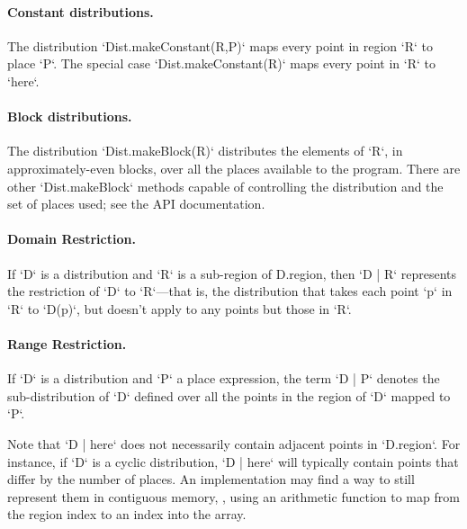 \paragraph{Constant distributions.} 
The distribution \xcd`Dist.makeConstant(R,P)` maps every point in region
\xcd`R` to place \xcd`P`.  
The special case \xcd`Dist.makeConstant(R)` maps every point in \xcd`R` to
\xcd`here`. 

\paragraph{Block distributions.}
The distribution \xcd`Dist.makeBlock(R)` distributes the elements of \xcd`R`,
in approximately-even blocks, over all the places available to the program. 
There are other \xcd`Dist.makeBlock` methods capable of controlling the
distribution and the set of places used; see the API documentation.


\paragraph{Domain Restriction.} 

If \xcd`D` is a distribution and \xcd`R` is a sub-region of {\cf
D.region}, then \xcd`D | R` represents the restriction of \xcd`D` to
\xcd`R`---that is, the distribution that takes each point \xcd`p` in \xcd`R`
to 
\xcd`D(p)`, 
but doesn't apply to any points but those in \xcd`R`.

\paragraph{Range Restriction.}

If \xcd`D` is a distribution and \xcd`P` a place expression, the term
\xcd`D | P` 
denotes the sub-distribution of \xcd`D` defined over all the
points in the region of \xcd`D` mapped to \xcd`P`.

Note that \xcd`D | here` does not necessarily contain adjacent points
in \xcd`D.region`. For instance, if \xcd`D` is a cyclic distribution,
\xcd`D | here` will typically contain points that differ by the number of
places. 
An implementation may find a
way to still represent them in contiguous memory, \eg, using an arithmetic
function to map from the region index to an index 
into the array.


